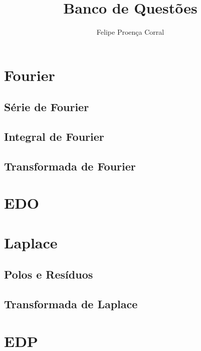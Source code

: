 

\title{Banco de Questões}
\author{Felipe Proença Corral}



\linespread{1.5}
\maketitle
\newpage
\tableofcontents
\newpage
{\large
\section{Fourier}
    \subsection{Série de Fourier}
        
    \newpage 
    \subsection{Integral de Fourier}
        
    \newpage
    \subsection{Transformada de Fourier}
        
    \newpage
    \section{EDO}
        
    \newpage   

    \section{Laplace}
    \subsection{Polos e Resíduos}
        
    \newpage
    \subsection{Transformada de Laplace}
        
\newpage
 \section{EDP}
     
}
 
